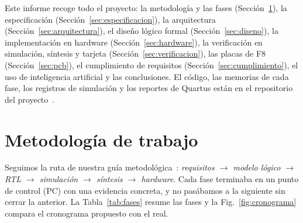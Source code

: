 \documentclass[conference,a4paper]{IEEEtran}
\begin{document}
Este informe recoge todo el proyecto: la metodología y las fases (Sección~\ref{sec:metodologia}), la especificación (Sección~\ref{sec:especificacion}), la arquitectura (Sección~\ref{sec:arquitectura}), el diseño lógico formal (Sección~\ref{sec:diseno}), la implementación en hardware (Sección~\ref{sec:hardware}), la verificación en simulación, síntesis y tarjeta (Sección~\ref{sec:verificacion}), las placas de F8 (Sección~\ref{sec:pcb}), el cumplimiento de requisitos (Sección~\ref{sec:cumplimiento}), el uso de inteligencia artificial y las conclusiones. El código, las memorias de cada fase, los registros de simulación y los reportes de Quartus están en el repositorio del proyecto~\cite{repo}.

\section{Metodología de trabajo}
\label{sec:metodologia}

Seguimos la ruta de nuestra guía metodológica~\cite{guia}: \emph{requisitos $\rightarrow$ modelo lógico $\rightarrow$ RTL $\rightarrow$ simulación $\rightarrow$ síntesis $\rightarrow$ hardware}. Cada fase terminaba en un punto de control (PC) con una evidencia concreta, y no pasábamos a la siguiente sin cerrar la anterior. La Tabla~\ref{tab:fases} resume las fases y la Fig.~\ref{fig:cronograma} compara el cronograma propuesto con el real.
\end{document}
